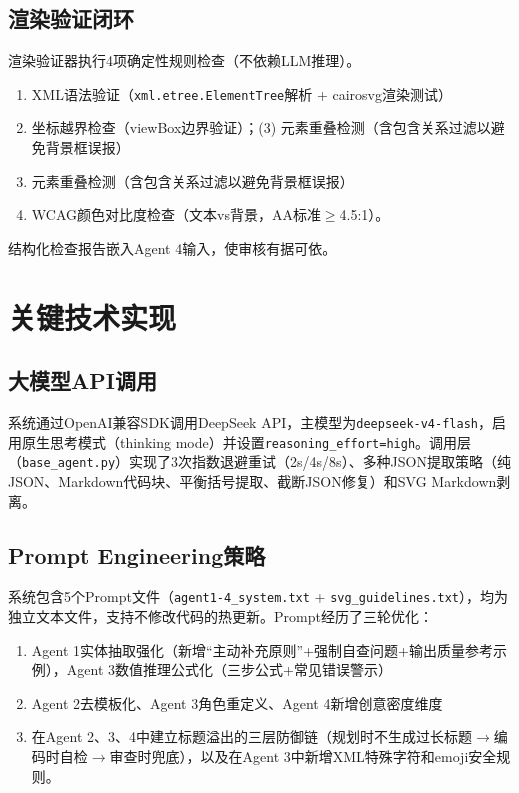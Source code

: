 \documentclass[11pt,a4paper]{article}
\begin{document}
\subsection{渲染验证闭环}

渲染验证器执行4项确定性规则检查（不依赖LLM推理）。

\begin{enumerate}
    \item XML语法验证（\texttt{xml.etree.ElementTree}解析 + cairosvg渲染测试\cite{cairosvg}）
    \item 坐标越界检查（viewBox边界验证）；(3) 元素重叠检测（含包含关系过滤以避免背景框误报）
    \item 元素重叠检测（含包含关系过滤以避免背景框误报）
    \item WCAG颜色对比度检查（文本vs背景，AA标准$\ge$4.5:1）。
\end{enumerate}

结构化检查报告嵌入Agent 4输入，使审核有据可依。

\section{关键技术实现}

\subsection{大模型API调用}

系统通过OpenAI兼容SDK调用DeepSeek API\cite{deepseek}，主模型为\texttt{deepseek-v4-flash}，启用原生思考模式（thinking mode）并设置\texttt{reasoning\_effort=high}。调用层（\texttt{base\_agent.py}）实现了3次指数退避重试（2s/4s/8s）、多种JSON提取策略（纯JSON、Markdown代码块、平衡括号提取、截断JSON修复）和SVG Markdown剥离。

\subsection{Prompt Engineering策略}

系统包含5个Prompt文件（\texttt{agent1-4\_system.txt} + \texttt{svg\_guidelines.txt}），均为独立文本文件，支持不修改代码的热更新。Prompt经历了三轮优化：

\begin{enumerate}
    \item Agent 1实体抽取强化（新增“主动补充原则”+强制自查问题+输出质量参考示例），Agent 3数值推理公式化（三步公式+常见错误警示）
    \item Agent 2去模板化、Agent 3角色重定义、Agent 4新增创意密度维度
    \item 在Agent 2、3、4中建立标题溢出的三层防御链（规划时不生成过长标题$\rightarrow$编码时自检$\rightarrow$审查时兜底），以及在Agent 3中新增XML特殊字符和emoji安全规则。
\end{enumerate}
\end{document}
